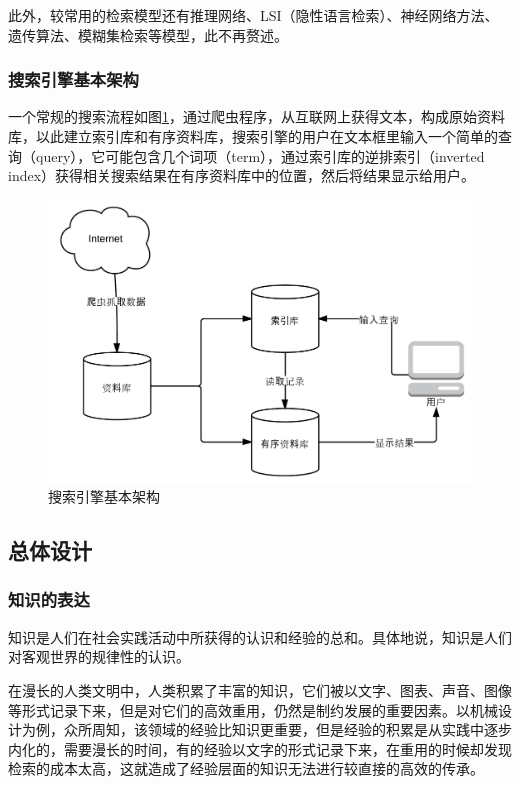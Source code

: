 \documentclass[12pt,a4paper]{article}
\begin{document}
	此外，较常用的检索模型还有推理网络、LSI（隐性语言检索）、神经网络方法、遗传算法、模糊集检索等模型，此不再赘述。
		
		\subsubsection{搜索引擎基本架构}
	一个常规的搜索流程如图\ref{fig:basicStructure}，通过爬虫程序，从互联网上获得文本，构成原始资料库，以此建立索引库和有序资料库，搜索引擎的用户在文本框里输入一个简单的查询（query），它可能包含几个词项（term），通过索引库的逆排索引（inverted index）获得相关搜索结果在有序资料库中的位置，然后将结果显示给用户。
		
	\begin{figure}[htbp] 
	\centering\includegraphics[width=5in]{fig/basicStructure.png} 
	\caption{搜索引擎基本架构}\label{fig:basicStructure} 
	\end{figure} 
		
	\subsection{总体设计}
		\subsubsection{知识的表达}
	知识是人们在社会实践活动中所获得的认识和经验的总和。具体地说，知识是人们对客观世界的规律性的认识。\cite{Chen2010}
	
	在漫长的人类文明中，人类积累了丰富的知识，它们被以文字、图表、声音、图像等形式记录下来，但是对它们的高效重用，仍然是制约发展的重要因素。以机械设计为例，众所周知，该领域的经验比知识更重要，但是经验的积累是从实践中逐步内化的，需要漫长的时间，有的经验以文字的形式记录下来，在重用的时候却发现检索的成本太高，这就造成了经验层面的知识无法进行较直接的高效的传承。
	
\end{document}
